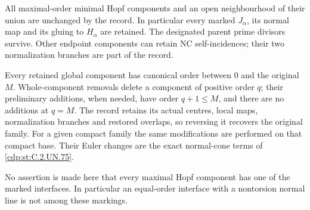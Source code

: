 \begin{proposition}
All maximal-order minimal Hopf components and an open
neighbourhood of their union are unchanged by the record.
In particular every marked \(J_\alpha\), its normal map and
its gluing to \(H_\alpha\) are retained. The designated parent
prime divisors survive. Other endpoint components can retain
NC self-incidences; their two normalization branches are
part of the record.

Every retained global component has canonical order between
\(0\) and the original \(M\). Whole-component removals delete
a component of positive order \(q\); their preliminary
additions, when needed, have order \(q+1\le M\), and there
are no additions at \(q=M\). The record retains its actual
centres, local maps, normalization branches and restored
overlaps, so reversing it recovers the original family.
For a given compact family the same modifications are
performed on that compact base. Their Euler changes are
the exact normal-cone terms of \ref{cdp:st:C.2.UN.75}.

No assertion is made here that every maximal Hopf component
has one of the marked interfaces. In particular an
equal-order interface with a nontorsion normal line is not
among these markings.
\end{proposition}

